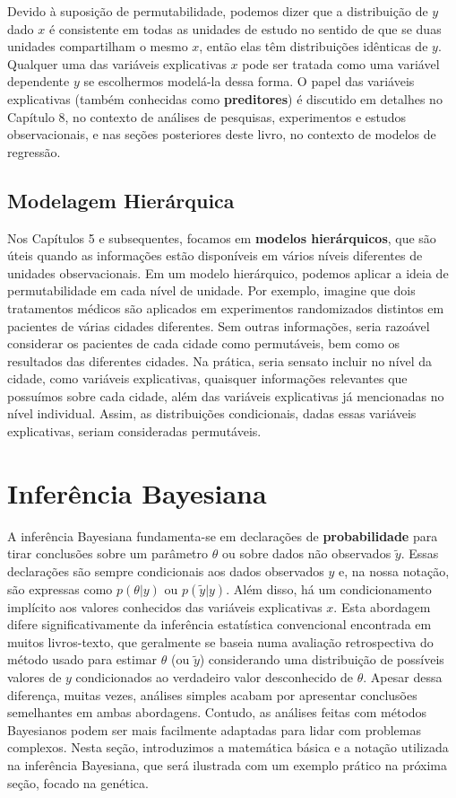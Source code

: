 Devido à suposição de permutabilidade, podemos dizer que a distribuição de $ y $ dado $ x $ é consistente em todas as unidades de estudo no sentido de que se duas unidades compartilham o mesmo $ x $, então elas têm distribuições idênticas de $ y $. Qualquer uma das variáveis explicativas $ x $ pode ser tratada como uma variável dependente $ y $ se escolhermos modelá-la dessa forma. O papel das variáveis explicativas (também conhecidas como \textbf{preditores}) é discutido em detalhes no Capítulo 8, no contexto de análises de pesquisas, experimentos e estudos observacionais, e nas seções posteriores deste livro, no contexto de modelos de regressão.

\subsection{Modelagem Hierárquica}

Nos Capítulos 5 e subsequentes, focamos em \textbf{modelos hierárquicos}, que são úteis quando as informações estão disponíveis em vários níveis diferentes de unidades observacionais. Em um modelo hierárquico, podemos aplicar a ideia de permutabilidade em cada nível de unidade. Por exemplo, imagine que dois tratamentos médicos são aplicados em experimentos randomizados distintos em pacientes de várias cidades diferentes. Sem outras informações, seria razoável considerar os pacientes de cada cidade como permutáveis, bem como os resultados das diferentes cidades. Na prática, seria sensato incluir no nível da cidade, como variáveis explicativas, quaisquer informações relevantes que possuímos sobre cada cidade, além das variáveis explicativas já mencionadas no nível individual. Assim, as distribuições condicionais, dadas essas variáveis explicativas, seriam consideradas permutáveis.

\section{Inferência Bayesiana}

A inferência Bayesiana fundamenta-se em declarações de \textbf{probabilidade} para tirar conclusões sobre um parâmetro $ \theta $ ou sobre dados não observados $ \tilde{y} $. Essas declarações são sempre condicionais aos dados observados $ y $ e, na nossa notação, são expressas como $ p(\theta|y) $ ou $ p(\tilde{y}|y) $. Além disso, há um condicionamento implícito aos valores conhecidos das variáveis explicativas $ x $. Esta abordagem difere significativamente da inferência estatística convencional encontrada em muitos livros-texto, que geralmente se baseia numa avaliação retrospectiva do método usado para estimar $ \theta $ (ou $ \tilde{y} $) considerando uma distribuição de possíveis valores de $ y $ condicionados ao verdadeiro valor desconhecido de $ \theta $. Apesar dessa diferença, muitas vezes, análises simples acabam por apresentar conclusões semelhantes em ambas abordagens. Contudo, as análises feitas com métodos Bayesianos podem ser mais facilmente adaptadas para lidar com problemas complexos. Nesta seção, introduzimos a matemática básica e a notação utilizada na inferência Bayesiana, que será ilustrada com um exemplo prático na próxima seção, focado na genética.

